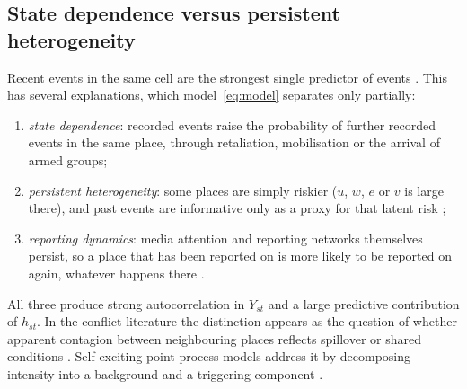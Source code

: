 \subsection{State dependence versus persistent heterogeneity}\label{sec:methods-persistence}

Recent events in the same cell are the strongest single predictor of events
\citep{weidmann2010predicting, mueller2022hard, menicali2026conflicts}. This has several explanations, which
model~\eqref{eq:model} separates only partially:
\begin{enumerate}
\item \emph{state dependence}: recorded events raise the probability of further
recorded events in the same place, through retaliation, mobilisation or the arrival
of armed groups;
\item \emph{persistent heterogeneity}: some places are simply riskier ($u$, $w$, $e$ or $v$
is large there), and past events are informative only as a proxy for that latent
risk \citep{heckman1981heterogeneity};
\item \emph{reporting dynamics}: media attention and reporting networks themselves
persist, so a place that has been reported on is more likely to be reported on
again, whatever happens there \citep{weidmann2016closer}.
\end{enumerate}
All three produce strong autocorrelation in $Y_{st}$ and a large predictive
contribution of $h_{st}$. In the conflict literature the distinction appears as
the question of whether apparent contagion between neighbouring places reflects
spillover or shared conditions \citep{buhaug2008contagion}. Self-exciting point
process models address it by decomposing intensity into a background and a
triggering component
\citep{mohler2011self, mohler2013multisource, porter2012hurdle, clark2018selfexciting,
reinhart2018review, jun2024hawkes}.

